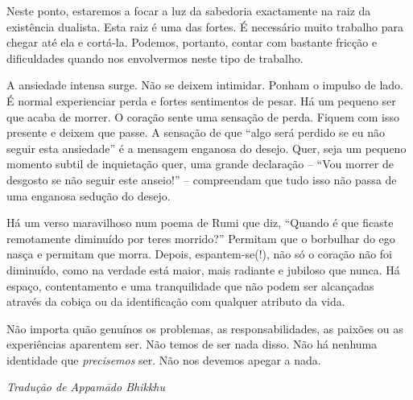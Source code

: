 Neste ponto, estaremos a focar a luz da sabedoria exactamente na raiz da
existência dualista. Esta raiz é uma das fortes. É necessário muito
trabalho para chegar até ela e cortá-la. Podemos, portanto, contar com
bastante fricção e dificuldades quando nos envolvermos neste tipo de
trabalho.

A ansiedade intensa surge. Não se deixem intimidar. Ponham o impulso de
lado. É normal experienciar perda e fortes sentimentos de pesar. Há um
pequeno ser que acaba de morrer. O coração sente uma sensação de perda.
Fiquem com isso presente e deixem que passe. A sensação de que ``algo
será perdido se eu não seguir esta ansiedade'' é a mensagem enganosa do
desejo. Quer, seja um pequeno momento subtil de inquietação quer, uma
grande declaração -- ``Vou morrer de desgosto se não seguir este
anseio!'' -- compreendam que tudo isso não passa de uma enganosa sedução
do desejo.

Há um verso maravilhoso num poema de Rumi que diz, ``Quando é que
ficaste remotamente diminuído por teres morrido?'' Permitam que o
borbulhar do ego nasça e permitam que morra. Depois, espantem-se(!), não
só o coração não foi diminuído, como na verdade está maior, mais
radiante e jubiloso que nunca. Há espaço, contentamento e uma
tranquilidade que não podem ser alcançadas através da cobiça ou da
identificação com qualquer atributo da vida.

Não importa quão genuínos os problemas, as responsabilidades, as paixões
ou as experiências aparentem ser. Não temos de ser nada disso. Não há
nenhuma identidade que \emph{precisemos} ser. Não nos devemos apegar a
nada.

\bigskip

{\raggedleft\itshape
  Tradução de Appamādo Bhikkhu
\par}
